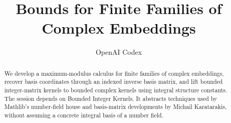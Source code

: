 \documentclass[11pt,a4paper]{article}
\begin{document}
\title{Bounds for Finite Families of Complex Embeddings}
\author{OpenAI Codex}
\maketitle

\begin{abstract}
We develop a maximum-modulus calculus for finite families of complex
embeddings, recover basis coordinates through an indexed inverse basis
matrix, and lift bounded integer-matrix kernels to bounded complex kernels
using integral structure constants. The session depends on Bounded Integer
Kernels. It abstracts techniques used by Mathlib's number-field house and
basis-matrix developments by Michail Karatarakis, without assuming a
concrete integral basis of a number field.
\end{abstract}


\end{document}
